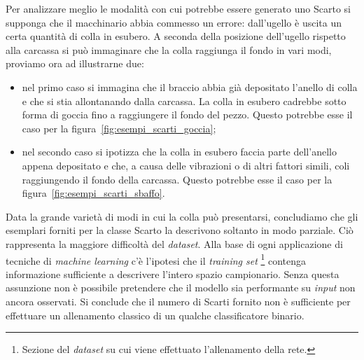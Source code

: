 Per analizzare meglio le modalità con cui potrebbe essere generato uno Scarto si supponga che il macchinario abbia commesso un errore: dall'ugello è uscita un certa quantità di colla in esubero.
A seconda della posizione dell'ugello rispetto alla carcassa si può immaginare che la colla raggiunga il fondo in vari modi, proviamo ora ad illustrarne due:
\begin{itemize}
  \item nel primo caso si immagina che il braccio abbia già depositato l'anello di colla e che si stia allontanando dalla carcassa.
    La colla in esubero cadrebbe sotto forma di goccia fino a raggiungere il fondo del pezzo.
    Questo potrebbe esse il caso per la figura~\ref{fig:esempi_scarti_goccia};
  \item nel secondo caso si ipotizza che la colla in esubero faccia parte dell'anello appena depositato e che, a causa delle vibrazioni o di altri fattori simili, coli raggiungendo il fondo della carcassa.
    Questo potrebbe esse il caso per la figura~\ref{fig:esempi_scarti_sbaffo}.
\end{itemize}

Data la grande varietà di modi in cui la colla può presentarsi, concludiamo che gli esemplari forniti per la classe Scarto la descrivono soltanto in modo parziale.
Ciò rappresenta la maggiore difficoltà del \textit{dataset}.
Alla base di ogni applicazione di tecniche di \textit{machine learning} c'è l'ipotesi che il \textit{training set} \footnote{Sezione del \textit{dataset} su cui viene effettuato l'allenamento della rete.} contenga informazione sufficiente a descrivere l'intero spazio campionario.
Senza questa assunzione non è possibile pretendere che il modello sia performante su \textit{input} non ancora osservati.
Si conclude che il numero di Scarti fornito non è sufficiente per effettuare un allenamento classico di un qualche classificatore binario.

